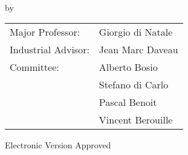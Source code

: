 \documentclass[12pt, notitlepage, twoside]{report}
\begin{document}

\newcommand{\degreesearned}{%
B.S., University of Rome "Tor Vergata", 2018\\
B.Sc., University of Rome "Tor Vergata", 2016
}%

\newcommand{\degreetype}{Dissertation}
\newcommand{\degreetitle}{Doctor of Philosophy}
\newcommand{\degreename}{Nano Electronics and Nano Technologies}
\newcommand{\degreeyear}{2023}
\maketitlepage





\newpage
\thispagestyle{empty}
\vspace*{18pt}
\begin{center}
  \textsc{\doctitle}\\[18pt]
  by\\[18pt]
  \textsc{\docauthor}
\end{center}
\vfill

\begin{flushright}
  \begin{tabular}{ll}
    Major Professor: & Giorgio di Natale \\ [8pt]
    Industrial Advisor: & Jean Marc Daveau \\ [8pt]
    Committee: & Alberto Bosio \\
    & Stefano di Carlo \\
    & Pascal Benoit \\
    & Vincent Berouille \\
  \end{tabular}
\end{flushright}

\vspace*{3cm}

\begin{flushleft}
  Electronic Version Approved\\[12pt]
\end{flushleft}
\vspace*{1.5cm}








\end{document}
